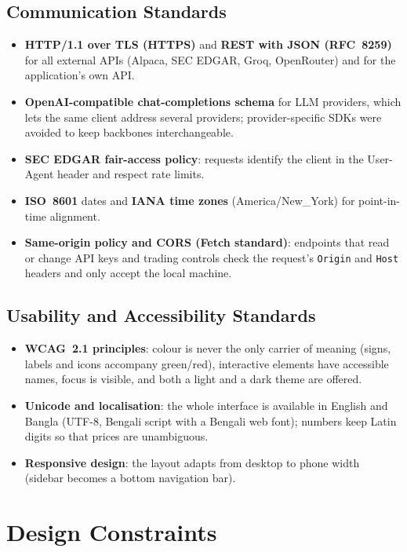\subsection{Communication Standards}
\begin{itemize}
  \item \textbf{HTTP/1.1 over TLS (HTTPS)} and \textbf{REST with JSON (RFC~8259)} for all external APIs (Alpaca, SEC EDGAR, Groq, OpenRouter) and for the application's own API.
  \item \textbf{OpenAI-compatible chat-completions schema} for LLM providers, which lets the same client address several providers; provider-specific SDKs were avoided to keep backbones interchangeable.
  \item \textbf{SEC EDGAR fair-access policy}: requests identify the client in the User-Agent header and respect rate limits.
  \item \textbf{ISO~8601} dates and \textbf{IANA time zones} (America/New\_York) for point-in-time alignment.
  \item \textbf{Same-origin policy and CORS (Fetch standard)}: endpoints that read or change API keys and trading controls check the request's \texttt{Origin} and \texttt{Host} headers and only accept the local machine.
\end{itemize}

\subsection{Usability and Accessibility Standards}
\begin{itemize}
  \item \textbf{WCAG~2.1 principles}: colour is never the only carrier of meaning (signs, labels and icons accompany green/red), interactive elements have accessible names, focus is visible, and both a light and a dark theme are offered.
  \item \textbf{Unicode and localisation}: the whole interface is available in English and Bangla (UTF-8, Bengali script with a Bengali web font); numbers keep Latin digits so that prices are unambiguous.
  \item \textbf{Responsive design}: the layout adapts from desktop to phone width (sidebar becomes a bottom navigation bar).
\end{itemize}

\section{Design Constraints}
